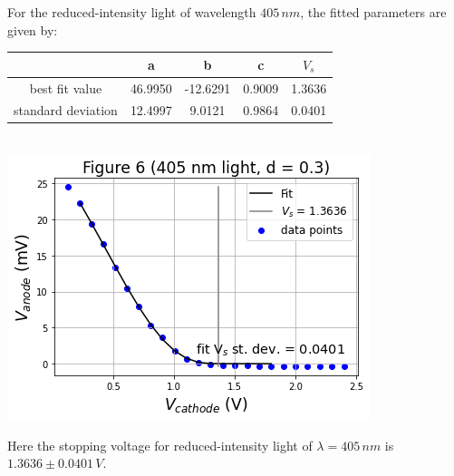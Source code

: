 \documentclass[11pt]{book}
\theoremstyle{break}
\theoremstyle{break}
\begin{document}
For the reduced-intensity light of wavelength $405\, nm$, the fitted parameters are given by:
\begin{center}
\begin{tabular}{|c|c|c|c|c|}
\hline
 & a & b & c & $V_s$\\
\hline
best fit value & 46.9950 & -12.6291 & 0.9009 & 1.3636 \\
\hline
standard deviation & 12.4997 & 9.0121 & 0.9864 & 0.0401 \\
\hline
\end{tabular}\\
\hfill\break
\hfill\break
\includegraphics[scale=0.5]{fig6.png}
\end{center}
Here the stopping voltage for reduced-intensity light of $\lambda = 405\, nm$ is $1.3636\pm 0.0401\, V$. \newpage
\end{document}
